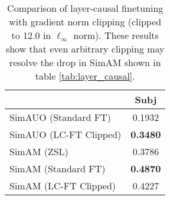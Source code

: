 \begin{table*}[th]
	\centering
	\setlength{\tabcolsep}{7pt}
		\begin{tabular}{l | c}
		\toprule
		& \textbf{Subj} \\
		\midrule
		 SimAUO (Standard FT)     & 0.1932 \\
		 SimAUO (LC-FT Clipped)   & \textbf{0.3480}  \\
		\midrule
		 SimAM (ZSL)                     & 0.3786 \\
		 SimAM (Standard FT)             & \textbf{0.4870} \\
		 SimAM (LC-FT Clipped)           & 0.4227 \\
		
		\end{tabular}
	\caption{
		Comparison of layer-causal finetuning with gradient norm clipping (clipped to 12.0 in $\ell_\infty$ norm).
		These results show that even arbitrary clipping may resolve the drop in SimAM shown in table \ref{tab:layer_causal}.
	}
	\label{tab:per_layer_clipping_metrics}
\end{table*}